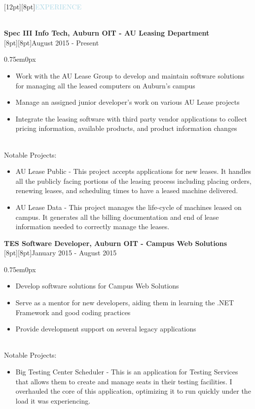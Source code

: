 \documentclass{res}
\newenvironment{ResumeBlock}[1]
{
	\begin{normalsize}
		\raisebox{0pt}[12pt][8pt]{\textcolor{lightblue}{#1}}
	\end{normalsize}
	\\
}
{	
}
\newenvironment{DetailsBlock}[2]
{
	\textbf{\color{darkfont}#1}
	\\
	\raisebox{0pt}[8pt][8pt]{#2}
	\begin{adjustwidth}{0.75em}{0px}
}
{	
	\end{adjustwidth}
}
\begin{document}
	\begin{ResumeBlock}{EXPERIENCE}
		\begin{DetailsBlock}{Spec III Info Tech, Auburn OIT - AU Leasing Department}{August 2015 - Present}
			\begin{itemize}
				\item Work with the AU Lease Group to develop and maintain software solutions for managing all the leased computers on Auburn's campus
				\item Manage an assigned junior developer's work on various AU Lease projects
				\item Integrate the leasing software with third party vendor  applications to collect pricing information, available products, and product information changes
			\end{itemize}
			~\\
			Notable Projects:
			\begin{itemize}
				\item AU Lease Public - This project accepts applications for new leases.  It handles all the publicly facing portions of the leasing process including placing orders, renewing leases, and scheduling times to have a leased machine delivered. 
				\item AU Lease Data - This project manages the life-cycle of machines leased on campus.  It generates all the billing documentation and end of lease information needed to correctly manage the leases.    
			\end{itemize}
		\end{DetailsBlock}		
		\begin{DetailsBlock}{TES Software Developer, Auburn OIT - Campus Web Solutions}{January 2015 - August 2015}
			\begin{itemize}
				\item Develop software solutions for Campus Web Solutions
				\item Serve as a mentor for new developers, aiding them in learning the .NET Framework and good coding practices 
				\item Provide development support on several legacy applications
			\end{itemize}
			~\\
			Notable Projects:
			\begin{itemize}
				\item Big Testing Center Scheduler - This is an application for Testing Services that allows them to create and manage seats in their testing facilities.  I overhauled the core of this application, optimizing it to run quickly under the load it was experiencing.

\end{itemize}
\end{DetailsBlock}
\end{ResumeBlock}
\end{document}
